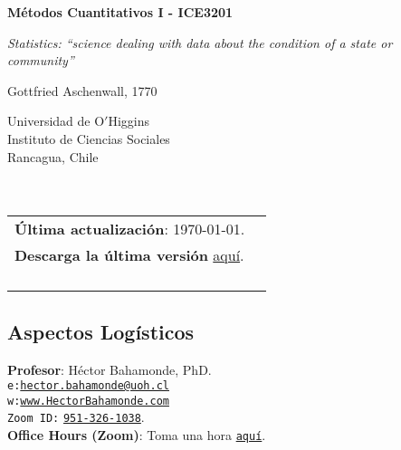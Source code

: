 \documentclass[letterpaper]{article}
\def\name{M\'etodos Cuantitativos I - ICE3201}
\begin{document}

\centerline{\huge \bf \name}

\epigraph{\emph{Statistics: ``science dealing with data about the condition of a state or community''}}{Gottfried Aschenwall, 1770}


\vspace{0.25in}

\begin{minipage}{0.45\linewidth}
 Universidad de O$'$Higgins \\
  Instituto de Ciencias Sociales \\
  Rancagua, Chile\\
  \\
  \\

\end{minipage}
\hspace{4cm}\begin{minipage}{0.45\linewidth}
  \begin{tabular}{ll}
{\bf \'Ultima actualizaci\'on}: \today. \\
 {\bf Descarga la \'ultima versi\'on} \href{https://github.com/hbahamonde/Metodos_Cuanti_I/raw/master/Bahamonde_Metodos_Cuanti_I.pdf}{aqu\'i}.%
    \\
    \\
    \\
    \\
    \\
  \end{tabular}
\end{minipage}



\subsection*{Aspectos Log\'isticos}


\vspace{1mm}
{\bf Profesor}: H\'ector Bahamonde, PhD.\\
\texttt{e:}\href{mailto:hector.bahamonde@uoh.cl}{\texttt{hector.bahamonde@uoh.cl}}\\
\texttt{w:}\href{http://www.hectorbahamonde.com}{\texttt{www.HectorBahamonde.com}}\\
\texttt{Zoom ID:} \href{https://us02web.zoom.us/j/9513261038?pwd=S3BSWXQxZW11NC9CRjRoMmd0TkpEZz09}{\texttt{951-326-1038}}.\\
{\bf Office Hours (Zoom)}: Toma una hora \href{https://calendly.com/bahamonde/officehours}{\texttt{aqu\'i}}.
\end{document}
